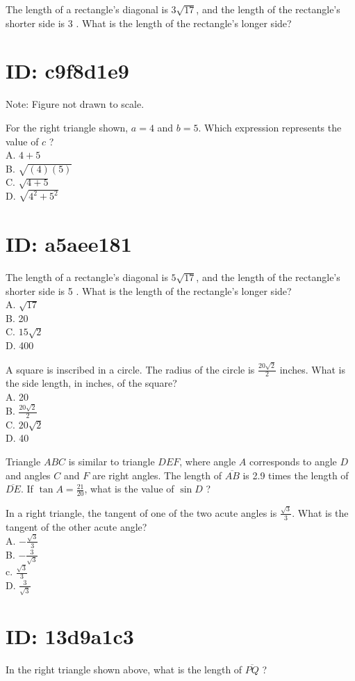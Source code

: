 The length of a rectangle's diagonal is $3 \sqrt{17}$, and the length of the rectangle's shorter side is 3 . What is the length of the rectangle's longer side?

\section*{ID: c9f8d1e9}
Note: Figure not drawn to scale.

For the right triangle shown, $a=4$ and $b=5$. Which expression represents the value of $c$ ?\\
A. $4+5$\\
B. $\sqrt{(4)(5)}$\\
C. $\sqrt{4+5}$\\
D. $\sqrt{4^{2}+5^{2}}$

\section*{ID: a5aee181}
The length of a rectangle's diagonal is $5 \sqrt{17}$, and the length of the rectangle's shorter side is 5 . What is the length of the rectangle's longer side?\\
A. $\sqrt{17}$\\
B. 20\\
C. $15 \sqrt{2}$\\
D. 400

A square is inscribed in a circle. The radius of the circle is $\frac{20 \sqrt{2}}{2}$ inches. What is the side length, in inches, of the square?\\
A. 20\\
B. $\frac{20 \sqrt{2}}{2}$\\
C. $20 \sqrt{2}$\\
D. 40

Triangle $A B C$ is similar to triangle $D E F$, where angle $A$ corresponds to angle $D$ and angles $C$ and $F$ are right angles. The length of $\overline{A B}$ is 2.9 times the length of $\overline{D E}$. If $\tan A=\frac{21}{20}$, what is the value of $\sin D$ ?

In a right triangle, the tangent of one of the two acute angles is $\frac{\sqrt{3}}{3}$. What is the tangent of the other acute angle?\\
A. $-\frac{\sqrt{3}}{3}$\\
B. $-\frac{3}{\sqrt{3}}$\\
c. $\frac{\sqrt{3}}{3}$\\
D. $\frac{3}{\sqrt{3}}$

\section*{ID: 13d9a1c3}
In the right triangle shown above, what is the length of $\overline{P Q}$ ?


